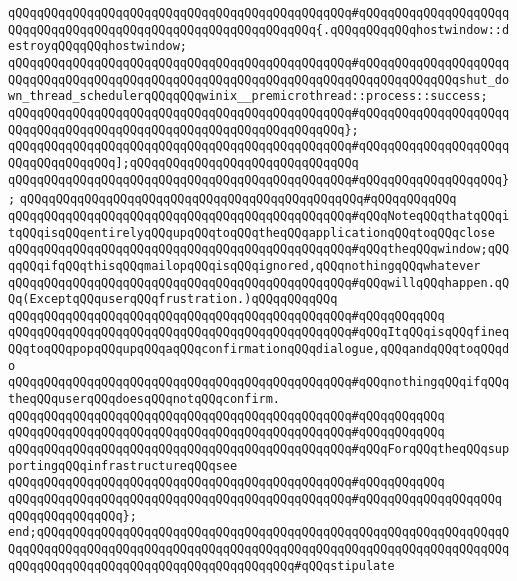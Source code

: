 \verb|qQQqqQQqqQQqqQQqqQQqqQQqqQQqqQQqqQQqqQQqqQQqqQQq#qQQqqQQqqQQqqQQqqQQqqQQqqQQqqQQqqQQqqQQqqQQqqQQqqQQqqQQqqQQqqQQq{.qQQqqQQqqQQqhostwindow::destroyqQQqqQQqhostwindow;|\newline
\verb|qQQqqQQqqQQqqQQqqQQqqQQqqQQqqQQqqQQqqQQqqQQqqQQq#qQQqqQQqqQQqqQQqqQQqqQQqqQQqqQQqqQQqqQQqqQQqqQQqqQQqqQQqqQQqqQQqqQQqqQQqqQQqqQQqqQQqshut_down_thread_schedulerqQQqqQQqwinix__premicrothread::process::success;|\newline
\verb|qQQqqQQqqQQqqQQqqQQqqQQqqQQqqQQqqQQqqQQqqQQqqQQq#qQQqqQQqqQQqqQQqqQQqqQQqqQQqqQQqqQQqqQQqqQQqqQQqqQQqqQQqqQQqqQQqqQQq};|\newline
\verb|qQQqqQQqqQQqqQQqqQQqqQQqqQQqqQQqqQQqqQQqqQQqqQQq#qQQqqQQqqQQqqQQqqQQqqQQqqQQqqQQqqQQq];qQQqqQQqqQQqqQQqqQQqqQQqqQQqqQQq|\newline
\verb|qQQqqQQqqQQqqQQqqQQqqQQqqQQqqQQqqQQqqQQqqQQqqQQq#qQQqqQQqqQQqqQQqqQQq};|\newline
\verb|qQQqqQQqqQQqqQQqqQQqqQQqqQQqqQQqqQQqqQQqqQQqqQQq#qQQqqQQqqQQq|\newline
\verb|qQQqqQQqqQQqqQQqqQQqqQQqqQQqqQQqqQQqqQQqqQQqqQQq#qQQqNoteqQQqthatqQQqitqQQqisqQQqentirelyqQQqupqQQqtoqQQqtheqQQqapplicationqQQqtoqQQqclose|\newline
\verb|qQQqqQQqqQQqqQQqqQQqqQQqqQQqqQQqqQQqqQQqqQQqqQQq#qQQqtheqQQqwindow;qQQqqQQqifqQQqthisqQQqmailopqQQqisqQQqignored,qQQqnothingqQQqwhatever|\newline
\verb|qQQqqQQqqQQqqQQqqQQqqQQqqQQqqQQqqQQqqQQqqQQqqQQq#qQQqwillqQQqhappen.qQQq(ExceptqQQquserqQQqfrustration.)qQQqqQQqqQQq|\newline
\verb|qQQqqQQqqQQqqQQqqQQqqQQqqQQqqQQqqQQqqQQqqQQqqQQq#qQQqqQQqqQQq|\newline
\verb|qQQqqQQqqQQqqQQqqQQqqQQqqQQqqQQqqQQqqQQqqQQqqQQq#qQQqItqQQqisqQQqfineqQQqtoqQQqpopqQQqupqQQqaqQQqconfirmationqQQqdialogue,qQQqandqQQqtoqQQqdo|\newline
\verb|qQQqqQQqqQQqqQQqqQQqqQQqqQQqqQQqqQQqqQQqqQQqqQQq#qQQqnothingqQQqifqQQqtheqQQquserqQQqdoesqQQqnotqQQqconfirm.|\newline
\verb|qQQqqQQqqQQqqQQqqQQqqQQqqQQqqQQqqQQqqQQqqQQqqQQq#qQQqqQQqqQQq|\newline
\verb|qQQqqQQqqQQqqQQqqQQqqQQqqQQqqQQqqQQqqQQqqQQqqQQq#qQQqqQQqqQQq|\newline
\verb|qQQqqQQqqQQqqQQqqQQqqQQqqQQqqQQqqQQqqQQqqQQqqQQq#qQQqForqQQqtheqQQqsupportingqQQqinfrastructureqQQqsee|\newline
\verb|qQQqqQQqqQQqqQQqqQQqqQQqqQQqqQQqqQQqqQQqqQQqqQQq#qQQqqQQqqQQq|\newline
\verb|qQQqqQQqqQQqqQQqqQQqqQQqqQQqqQQqqQQqqQQqqQQqqQQq#qQQqqQQqqQQqqQQqqQQq|\newline
\verb|qQQqqQQqqQQqqQQq};|\newline
\verb|end;qQQqqQQqqQQqqQQqqQQqqQQqqQQqqQQqqQQqqQQqqQQqqQQqqQQqqQQqqQQqqQQqqQQqqQQqqQQqqQQqqQQqqQQqqQQqqQQqqQQqqQQqqQQqqQQqqQQqqQQqqQQqqQQqqQQqqQQqqQQqqQQqqQQqqQQqqQQqqQQqqQQqqQQqqQQqqQQq#qQQqstipulate|\newline
\newline
\newline

